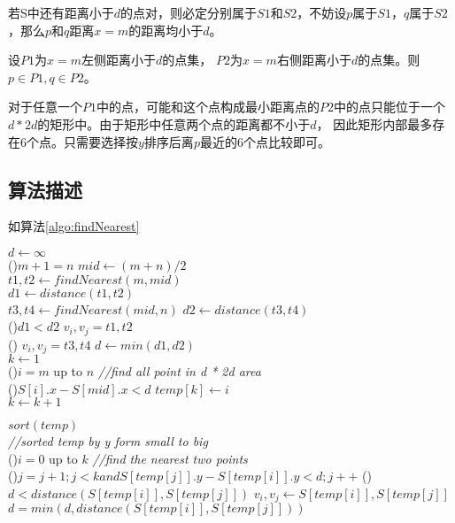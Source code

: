若S中还有距离小于$d$的点对，则必定分别属于$S1$和$S2$，不妨设$p$属于$S1$，$q$属于$S2$，那么$p$和$q$距离$x=m$的距离均小于$d$。

设$P1$为$x=m$左侧距离小于$d$的点集， $P2$为$x=m$右侧距离小于$d$的点集。则 $p \in P1, q \in P2$。

对于任意一个$P1$中的点，可能和这个点构成最小距离点的$P2$中的点只能位于一个 $d * 2d$的矩形中。由于矩形中任意两个点的距离都不小于$d$，
因此矩形内部最多存在6个点。只需要选择按$y$排序后离$p$最近的6个点比较即可。


\subsection*{算法描述}

如算法\ref{algo:findNearest}

\begin{algorithm}[htbp]
    \caption{$findNearest(S[1..n])$}\label{algo:findNearest}
    $d \leftarrow \infty$\\

    \If(){$m+1=n$}{
    }
    $mid \leftarrow (m+n)/2 $\\
    $t1, t2 \leftarrow findNearest(m,mid)$\\
    $d1 \leftarrow distance(t1,t2)$\\
    $t3, t4 \leftarrow findNearest(mid, n)$
    $d2 \leftarrow distance(t3, t4)$\\
    \If(){$d1 < d2$}{
        $v_i, v_j = t1, t2$\\
    }\Else(){
        $v_i, v_j = t3, t4$
    }
    $d \leftarrow min(d1, d2)$\\
    $k \leftarrow 1$ \\
    \For(){$i = m$ up to $n$}{ \emph{//find all point in d * 2d area} \\
        \If(){$S[i].x-S[mid].x < d$}{
            $temp[k] \leftarrow i$\\
            $k \leftarrow k+1$
        }
    }

    $sort(temp)$ \\
    \emph{//sorted temp by y form small to big} \\

    \For(){$i= 0$ up to $k$}{ \emph{//find the nearest two points}\\
        \For(){$j=j+1; j<k and S[temp[j]].y - S[temp[i]].y < d; j++$}{
            \If(){$d < distance(S[temp[i]], S[temp[j]])$}{
                $v_i, v_j \leftarrow S[temp[i]], S[temp[j]] $
            }
            $d=min(d, distance(S[temp[i]], S[temp[j]]))$
        }
    }

\end{algorithm}


